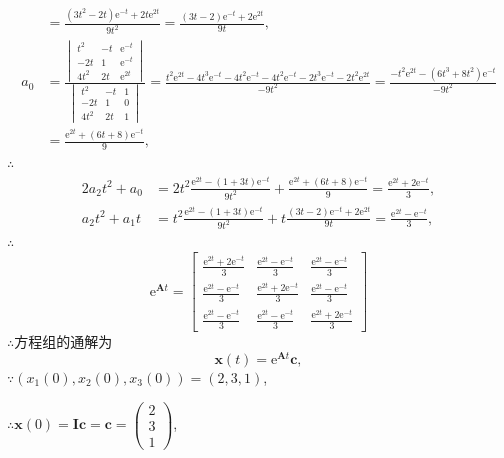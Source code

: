 \documentclass[12pt,UTF8]{ctexart}
\newcommand{\me}[0]{\mathrm e}
\begin{document}
\begin{enumerate}
\[\begin{aligned}
&=\frac{(3t^2-2t)\me^{-t}+2t\me^{2t}}{9t^2}=\frac{(3t-2)\me^{-t}+2\me^{2t}}{9t},\\
a_0&=\frac{\begin{vmatrix}t^2&-t&\me^{-t}\\-2t&1&\me^{-t}\\4t^2&2t&\me^{2t}\end{vmatrix}}{\begin{vmatrix}t^2&-t&1\\-2t&1&0\\4t^2&2t&1\end{vmatrix}}=\frac{t^2\me^{2t}-4t^3\me^{-t}-4t^2\me^{-t}-4t^2\me^{-t}-2t^3\me^{-t}-2t^2\me^{2t}}{-9t^2}=\frac{-t^2\me^{2t}-(6t^3+8t^2)\me^{-t}}{-9t^2}\\
&=\frac{\me^{2t}+(6t+8)\me^{-t}}{9},
\end{aligned}\]
$\therefore$
\[\begin{aligned}
2a_2t^2+a_0&=2t^2\frac{\me^{2t}-(1+3t)\me^{-t}}{9t^2}+\frac{\me^{2t}+(6t+8)\me^{-t}}9=\frac{\me^{2t}+2\me^{-t}}3,\\
a_2t^2+a_1t&=t^2\frac{\me^{2t}-(1+3t)\me^{-t}}{9t^2}+t\frac{(3t-2)\me^{-t}+2\me^{2t}}{9t}=\frac{\me^{2t}-\me^{-t}}3,
\end{aligned}\]
$\therefore$
\[\me^{\bm At}=\begin{bmatrix}\frac{\me^{2t}+2\me^{-t}}3&\frac{\me^{2t}-\me^{-t}}3&\frac{\me^{2t}-\me^{-t}}3\\
\frac{\me^{2t}-\me^{-t}}3&\frac{\me^{2t}+2\me^{-t}}3&\frac{\me^{2t}-\me^{-t}}3\\
\frac{\me^{2t}-\me^{-t}}3&\frac{\me^{2t}-\me^{-t}}3&\frac{\me^{2t}+2\me^{-t}}3
\end{bmatrix}\]
$\therefore$方程组的通解为
\[\bm x(t)=\me^{\bm At}\bm c,\]
$\because(x_1(0),x_2(0),x_3(0))=(2,3,1)$,

$\therefore\bm x(0)=\bm I\bm c=\bm c=\begin{pmatrix}2\\3\\1\end{pmatrix}$,


\end{enumerate}
\end{document}
